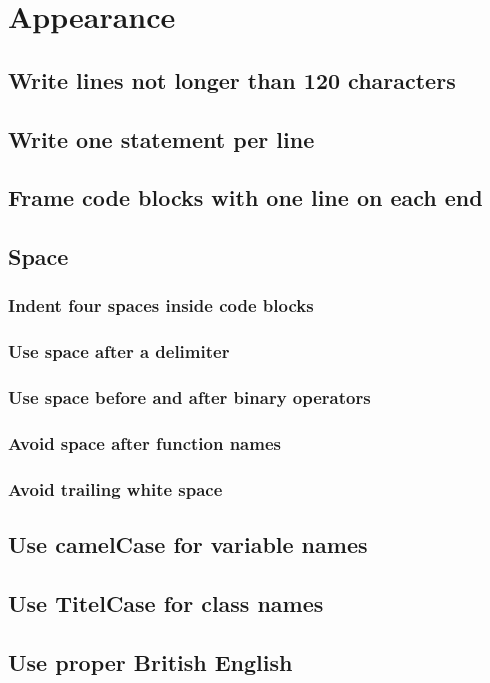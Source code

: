 \documentclass[a4paper,11pt]{scrreprt}
\begin{document}
\chapter{Appearance}
\section{Write lines not longer than 120 characters}
\section{Write one statement per line}
\section{Frame code blocks with one line on each end}
\section{Space}
\subsection{Indent four spaces inside code blocks}
\subsection{Use space after a delimiter}
\subsection{Use space before and after binary operators}
\subsection{Avoid space after function names}
\subsection{Avoid trailing white space}
\section{Use camelCase for variable names}
\section{Use TitelCase for class names}
\section{Use proper British English}
\end{document}
